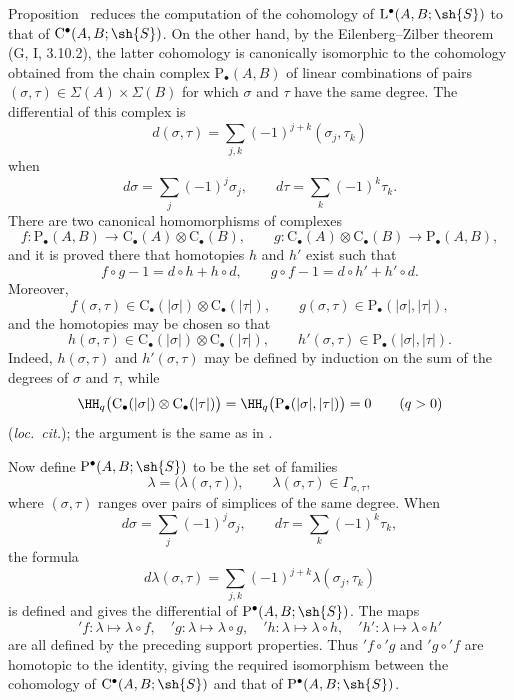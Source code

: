 \begin{env}[11.8.6]
\label{0.11.8.6}
Proposition~ reduces the computation of the cohomology of
$\mathrm{L}^\bullet(A,B;\sh{S})$ to that of
$\mathrm{C}^\bullet(A,B;\sh{S})$.
On the other hand, by the Eilenberg--Zilber theorem
(G, I, 3.10.2), the latter cohomology is canonically isomorphic to the
cohomology obtained from the chain complex
$\mathrm{P}_\bullet(A,B)$ of linear combinations of pairs
$(\sigma,\tau)\in\Sigma(A)\times\Sigma(B)$ for which $\sigma$ and
$\tau$ have the same degree.
The differential of this complex is
\[
  d(\sigma,\tau)
  =
  \sum_{j,k}(-1)^{j+k}(\sigma_j,\tau_k)
\]
when
\[
  d\sigma=\sum_j(-1)^j\sigma_j,
  \qquad
  d\tau=\sum_k(-1)^k\tau_k.
\]
There are two canonical homomorphisms of complexes
\[
  f:\mathrm{P}_\bullet(A,B)
  \longrightarrow
  \mathrm{C}_\bullet(A)\otimes\mathrm{C}_\bullet(B),
  \qquad
  g:\mathrm{C}_\bullet(A)\otimes\mathrm{C}_\bullet(B)
  \longrightarrow
  \mathrm{P}_\bullet(A,B),
\]
and it is proved there that homotopies $h$ and $h'$ exist such that
\[
  f\circ g-1=d\circ h+h\circ d,
  \qquad
  g\circ f-1=d\circ h'+h'\circ d.
\]
Moreover,
\[
  f(\sigma,\tau)
  \in
  \mathrm{C}_\bullet(|\sigma|)
  \otimes
  \mathrm{C}_\bullet(|\tau|),
  \qquad
  g(\sigma,\tau)
  \in
  \mathrm{P}_\bullet(|\sigma|,|\tau|),
\]
and the homotopies may be chosen so that
\[
  h(\sigma,\tau)
  \in
  \mathrm{C}_\bullet(|\sigma|)
  \otimes
  \mathrm{C}_\bullet(|\tau|),
  \qquad
  h'(\sigma,\tau)
  \in
  \mathrm{P}_\bullet(|\sigma|,|\tau|).
\]
Indeed, $h(\sigma,\tau)$ and $h'(\sigma,\tau)$ may be defined by
induction on the sum of the degrees of $\sigma$ and $\tau$, while
\[
  \HH_q\bigl(
    \mathrm{C}_\bullet(|\sigma|)
    \otimes
    \mathrm{C}_\bullet(|\tau|)
  \bigr)
  =
  \HH_q\bigl(\mathrm{P}_\bullet(|\sigma|,|\tau|)\bigr)
  =
  0
  \qquad(q>0)
\]
(\emph{loc.\ cit.}); the argument is the same as in
.

Now define $\mathrm{P}^\bullet(A,B;\sh{S})$ to be the set of families
\[
  \lambda=\bigl(\lambda(\sigma,\tau)\bigr),
  \qquad
  \lambda(\sigma,\tau)\in\Gamma_{\sigma,\tau},
\]
where $(\sigma,\tau)$ ranges over pairs of simplices of the same degree.
When
\[
  d\sigma=\sum_j(-1)^j\sigma_j,
  \qquad
  d\tau=\sum_k(-1)^k\tau_k,
\]
the formula
\[
  d\lambda(\sigma,\tau)
  =
  \sum_{j,k}(-1)^{j+k}\lambda(\sigma_j,\tau_k)
\]
is defined and gives the differential of
$\mathrm{P}^\bullet(A,B;\sh{S})$.
The maps
\[
  {}'\!f:\lambda\longmapsto\lambda\circ f,\quad
  {}'\!g:\lambda\longmapsto\lambda\circ g,\quad
  {}'\!h:\lambda\longmapsto\lambda\circ h,\quad
  {}'\!h':\lambda\longmapsto\lambda\circ h'
\]
are all defined by the preceding support properties.
Thus ${}'\!f\circ{}'\!g$ and ${}'\!g\circ{}'\!f$ are homotopic to the
identity, giving the required isomorphism between the cohomology of
$\mathrm{C}^\bullet(A,B;\sh{S})$ and that of
$\mathrm{P}^\bullet(A,B;\sh{S})$.
\end{env}

